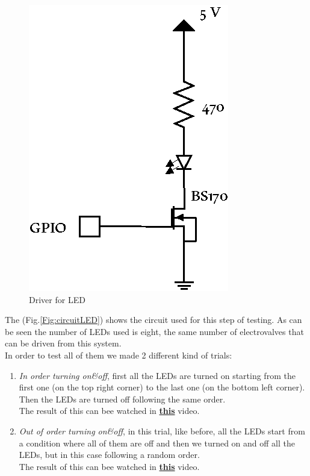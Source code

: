\documentclass[12pt,a4paper,twoside]{article}
\begin{document}
	\begin{figure}[h]
		\centering
		\includegraphics[]{Driver/driverLED}
		\caption{Driver for LED}
		\label{Fig:driverLED}
	\end{figure}
	
	The (Fig.\ref{Fig:circuitLED}) shows the circuit used for this step of testing. As can be seen the number of LEDs used is eight, the same number of electrovalves that can be driven from this system.\\
	In order to test all of them we made 2 different kind of trials:
	\begin{enumerate}
		\item \textit{In order turning on\&off}, first all the LEDs are turned on starting from the first one (on the top right corner) to the last one (on the bottom left corner). Then the LEDs are turned off following the same order.\\The result of this can bee watched in  \href{http://youtu.be/iYeAMpxM9uI}{\textbf{this}} video.
		\item \textit{Out of order turning on\&off}, in this trial, like before, all the LEDs start from a condition where all of them are off and then we turned on and off all the LEDs, but in this case following a random order.\\ The result of this can bee watched in  \href{http://youtu.be/mIoylW334Ck}{\textbf{this}} video.
	\end{enumerate}
	
\end{document}
